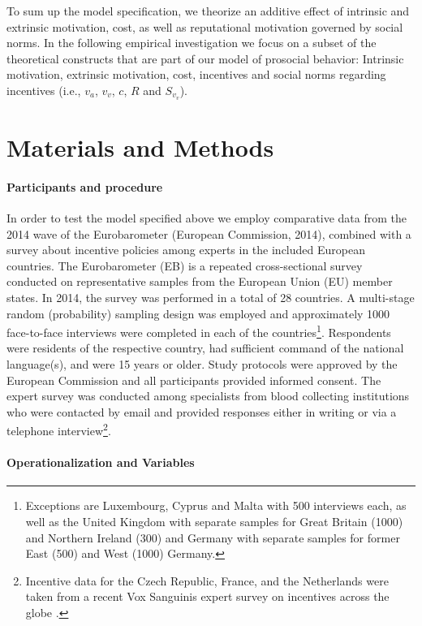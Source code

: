 \documentclass[AER]{AEA}
\begin{document}
To sum up the model specification, we theorize an additive effect of intrinsic and extrinsic motivation, cost, as well as reputational motivation governed by social norms. In the following empirical investigation we focus on a subset of the theoretical constructs that are part of our model of prosocial behavior: Intrinsic motivation, extrinsic motivation, cost, incentives and social norms regarding incentives (i.e., $v_{a}$, $v_{v}$, $c$, $R$ and $S_{v_{v}}$).

\section{Materials and Methods}

\paragraph{Participants and procedure}

In order to test the model specified above we employ comparative data from the 2014 wave of the Eurobarometer (European Commission, 2014), combined with a survey about incentive policies among experts in the included European countries. The Eurobarometer (EB) is a repeated cross-sectional survey conducted on representative samples from the European Union (EU) member states. In 2014, the survey was performed in a total of 28 countries. A multi-stage random (probability) sampling design was employed and approximately 1000 face-to-face interviews were completed in each of the countries\footnote{Exceptions are Luxembourg, Cyprus and Malta with 500 interviews each, as well as the United Kingdom with separate samples for Great Britain (1000) and Northern Ireland (300) and Germany with separate samples for former East (500) and West (1000) Germany.}. Respondents were residents of the respective country, had sufficient command of the national language(s), and were 15 years or older. Study protocols were approved by the European Commission and all participants provided informed consent. The expert survey was conducted among specialists from blood collecting institutions who were contacted by email and provided responses either in writing or via a telephone interview\footnote{Incentive data for the Czech Republic, France, and the Netherlands were taken from a recent Vox Sanguinis expert survey on incentives across the globe \citep{zeller_vox_2020}.}.

\paragraph{Operationalization and Variables}
\end{document}
